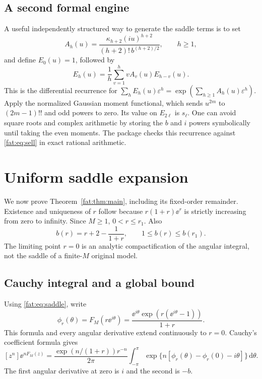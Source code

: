 \documentclass[11pt,letterpaper]{article}
\numberwithin{equation}{section}
\theoremstyle{remark}\newtheorem{remark}[theorem]{Remark}
\newcommand{\dd}{\,\mathrm d}\newcommand{\TV}{d_{\mathrm{TV}}}\newcommand{\Pois}{\operatorname{Pois}}
\begin{document}
\subsection{A second formal engine}
A useful independently structured way to generate the saddle terms is to set
\[
 A_h(u)=\frac{\kappa_{h+2}(iu)^{h+2}}{(h+2)!\,b^{(h+2)/2}},\qquad h\ge1,
\]
and define $E_0(u)=1$, followed by
\begin{equation}\label{fat:eq:engine2}
 E_h(u)=\frac1h\sum_{v=1}^h vA_v(u)E_{h-v}(u).
\end{equation}
This is the differential recurrence for
$\sum_hE_h(u)\varepsilon^h=\exp(\sum_{h\ge1}A_h(u)\varepsilon^h)$.
Apply the normalized Gaussian moment functional, which sends $u^{2m}$ to $(2m-1)!!$ and odd powers to zero. Its value on $E_{2\ell}$ is $s_\ell$. One can avoid square roots and complex arithmetic by storing the $b$ and $i$ powers symbolically until taking the even moments. The package checks this recurrence against \eqref{fat:eq:sell} in exact rational arithmetic.

\section{Uniform saddle expansion}\label{fat:sec:proof}
We now prove Theorem~\ref{fat:thm:main}, including its fixed-order remainder. Existence and uniqueness of $r$ follow because $r(1+r)\ee^r$ is strictly increasing from zero to infinity. Since $M\ge1$, $0<r\le r_1$. Also
\[
 b(r)=r+2-\frac1{1+r},\qquad 1\le b(r)\le b(r_1).
\]
The limiting point $r=0$ is an analytic compactification of the angular integral, not the saddle of a finite-$M$ original model.

\subsection{Cauchy integral and a global bound}
Using \eqref{fat:eq:saddle}, write
\begin{equation}\label{fat:eq:phi}
 \phi_r(\theta)=F_M(r\ee^{i\theta})
 =\frac{\ee^{i\theta}\exp(r(\ee^{i\theta}-1))}{1+r}.
\end{equation}
This formula and every angular derivative extend continuously to $r=0$. Cauchy's coefficient formula gives
\begin{equation}\label{fat:eq:cauchy}
 [z^n]\ee^{nF_M(z)}=
 \frac{\exp(n/(1+r))r^{-n}}{2\pi}
 \int_{-\pi}^{\pi}
 \exp\{n[\phi_r(\theta)-\phi_r(0)-i\theta]\}\dd\theta.
\end{equation}
The first angular derivative at zero is $i$ and the second is $-b$.
\end{document}
